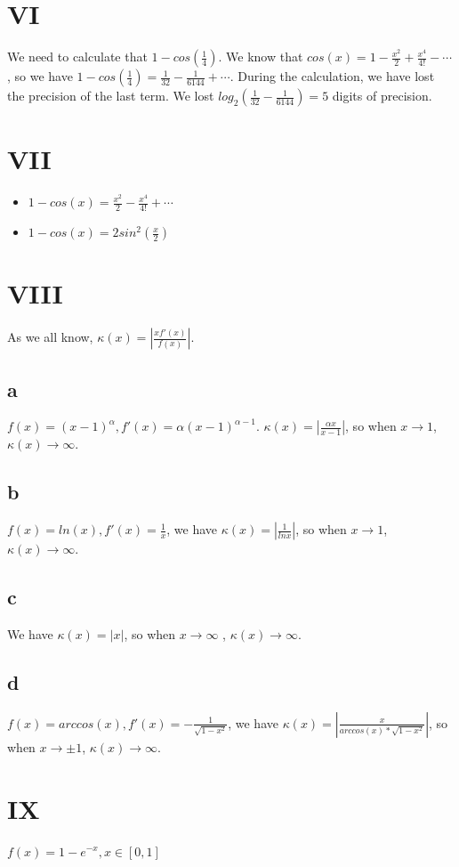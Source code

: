 \documentclass[a4paper]{article}
\begin{document}
\section*{VI}
We need to calculate that $1 - cos(\frac{1}{4})$.
We know that $cos(x) = 1 - \frac{x^2}{2} + \frac{x^4}{4!} - \cdots$, so we have $1 - cos(\frac{1}{4}) = \frac{1}{32}-\frac{1}{6144}+ \cdots$.
During the calculation, we have lost the precision of the last term. We lost $log_2(\frac{1}{32}-\frac{1}{6144})= 5$ digits of precision.

\section*{VII}
\begin{itemize}
    \item $1 - cos(x) = \frac{x^2}{2} - \frac{x^4}{4!} + \cdots$
    \item $1 - cos(x) = 2 sin^{2}(\frac{x}{2}) $
\end{itemize}

\section*{VIII}
As we all know, $\kappa(x) = |\frac{xf'(x)}{f(x)}|$.
\subsection*{a}
$f(x)=(x-1)^{\alpha}, f'(x) = \alpha(x-1)^{\alpha-1}.$ $\kappa(x) = |\frac{\alpha x}{x-1}|$, so when $x \to 1$, $\kappa(x) \to \infty$.
\subsection*{b}
$f(x) = ln(x), f'(x) = \frac{1}{x}$, we have $\kappa(x) = |\frac{1}{lnx}|$, so when $x \to 1$, $\kappa(x) \to \infty$.
\subsection*{c}
We have $\kappa(x)=|x|$, so when $x \to \infty$ , $\kappa(x) \to \infty$.
\subsection*{d}
$f(x)=arccos(x),f'(x) = -\frac{1}{\sqrt{1-x^2} }$, we have $\kappa(x) = |\frac{x}{arccos(x)*\sqrt{1-x^2}}|$, so when $x \to \pm 1$, $\kappa(x) \to \infty$.

\section*{IX}
$f(x)=1 - e^{-x}, x \in [0,1]$
\end{document}
